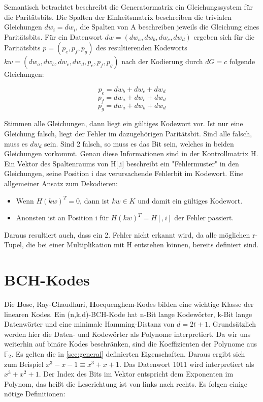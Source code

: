 Semantisch betrachtet beschreibt die Generatormatrix ein Gleichungssystem für die Paritätsbits. Die Spalten der Einheitsmatrix beschreiben die trivialen Gleichungen $dw_i = dw_i$, die Spalten von A beschreiben jeweils die Gleichung eines Paritätsbits. Für ein Datenwort $dw=(dw_a,dw_b,dw_c,dw_d)$ ergeben sich für die Paritätsbits $p=(p_e,p_f,p_g)$ des resultierenden Kodeworts $kw=(dw_a,dw_b,dw_c,dw_d,p_e,p_f,p_g)$ nach der Kodierung durch $dG = c$ folgende Gleichungen:

$$ p_e = dw_b+dw_c+dw_d$$
$$ p_f = dw_a+dw_c+dw_d$$
$$ p_g = dw_a+dw_b+dw_d$$

Stimmen alle Gleichungen, dann liegt ein gültiges Kodewort vor. Ist nur eine Gleichung falsch, liegt der Fehler im dazugehörigen Paritätsbit. Sind alle falsch, muss es $dw_d$ sein. Sind 2 falsch, so muss es das Bit sein, welches in beiden Gleichungen vorkommt. Genau diese Informationen sind in der Kontrollmatrix H. Ein Vektor des Spaltenraums von H[,i] beschreibt ein "Fehlermuster" in den Gleichungen, seine Position i das verursachende Fehlerbit im Kodewort. Eine allgemeiner Ansatz zum Dekodieren:

\begin{itemize}
\item Wenn $H(kw)^T = 0$, dann ist $kw \in K$ und damit ein gültiges Kodewort.
\item Anonsten ist an Position i für $H(kw)^T = H[ ,i]$ der Fehler passiert.
\end{itemize}

Daraus resultiert auch, dass ein 2. Fehler nicht erkannt wird, da alle möglichen r-Tupel, die bei einer Multiplikation mit H entstehen können, bereits definiert sind. 


\section{BCH-Kodes}
\label{sec:bch}

Die \textbf{B}ose, Ray-\textbf{C}haudhuri, \textbf{H}ocquenghem-Kodes bilden eine wichtige Klasse der linearen Kodes.\cite[S. 168]{huffman2010fundamentals}
Ein (n,k,d)-BCH-Kode hat n-Bit lange Kodewörter, k-Bit lange Datenwörter und eine minimale Hamming-Distanz von $d = 2t+1$.
Grundsätzlich werden hier die Daten- und Kodewörter als Polynome interpretiert. Da wir uns weiterhin auf binäre Kodes beschränken, sind die Koeffizienten der Polynome aus 
$\mathbb{F}_{2}$. Es gelten die in \ref{sec:general} definierten Eigenschaften. Daraus ergibt sich zum Beispiel $x^3 -x -1 \equiv x^3 + x + 1$. Das Datenwort 1011 wird interpretiert als $x^3 + x^2 + 1$. Der Index des Bits im Vektor entspricht dem Exponenten im Polynom, das heißt die Leserichtung ist von links nach rechts. 
Es folgen einige nötige Definitionen:

